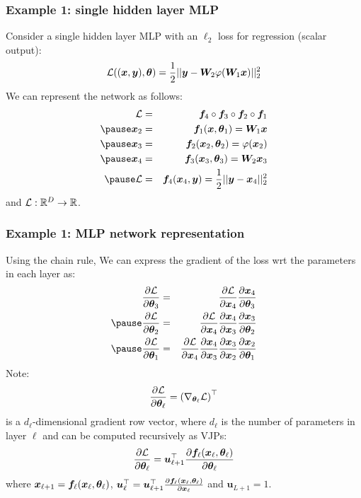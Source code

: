 \documentclass[smaller, handout]{beamer}
\begin{document}
\begin{frame}
  \frametitle{Example 1: single hidden layer MLP}\pause

  Consider a single hidden layer MLP with an $\ell_2$ loss for regression (scalar output):\pause
  \begin{equation}
    \mathcal{L}((\bm x, \bm y),\bm{\theta}) = \frac12 ||\bm y - \bm W_2\varphi(\bm W_1\bm x)||_2^2
  \end{equation}
  \pause
  We can represent the network as follows:\pause
  \begin{eqnarray}
    \mc L &=& \bm f_4 \circ \bm f_3 \circ \bm f_2 \circ \bm f_1  \\\pause
    \bm x_2 &=& \bm f_1(\bm x, \bm\th_1) = \bm W_1 \bm x \\\pause
    \bm x_3 &=& \bm f_2(\bm x_2, \bm\th_2) = \varphi(\bm x_2) \\\pause
    \bm x_4 &=& \bm f_3(\bm x_3, \bm\th_3) = \bm W_2 \bm x_3 \\\pause
    \mc L &=& \bm f_4(\bm x_4, \bm y) = \fr12||\bm y - \bm x_4||_2^2
  \end{eqnarray}
  and $\mathcal L : \mathbb{R}^D \to \mathbb{R}$.
\end{frame}
\begin{frame}
  \frametitle{Example 1: MLP network representation}\pause

  Using the chain rule, We can express the gradient of the loss wrt the parameters in each layer as:\pause
  \begin{eqnarray}
    \pd{\mc L}{\bm\th_3} &=& \pd{\mc L}{\bm x_4} \pd{\bm x_4}{\bm\th_3} \\\pause
    \pd{\mc L}{\bm\th_2} &=& \pd{\mc L}{\bm x_4} \pd{\bm x_4}{\bm x_3} \pd{\bm x_3}{\bm\th_2} \\ \pause
    \pd{\mc L}{\bm\th_1} &=& \pd{\mc L}{\bm x_4} \pd{\bm x_4}{\bm x_3} \pd{\bm x_3}{\bm x_2} \pd{\bm x_2}{\bm\th_1}
  \end{eqnarray}
  \pause
  Note:
  \begin{equation}
    \frac{\partial{\mathcal L}}{\partial{\bm{\theta}_\ell}} = \left(\nabla_{\bm{\theta}_\ell} \mathcal L\right)^{\top}
  \end{equation}
  is a $d_\ell$-dimensional gradient row vector, where $d_\ell$ is the number of parameters in layer $\ell$ \pause and can be computed recursively as VJPs:
  \begin{equation}
    \frac{\partial{\mathcal L}}{\partial{\bm{\theta}_\ell}} = \bm u_{\ell+1}^{\top} \frac{\partial{\bm f_\ell(\bm x_\ell, \bm{\theta}_\ell)}}{\partial{\bm{\theta}_\ell}}
  \end{equation}
  where $\bm x_{\ell+1} = \bm f_\ell(\bm x_\ell, \bm{\theta}_\ell)$, $\bm u_{\ell}^{\top} = \bm u_{\ell+1}^{\top}\frac{\partial{\bm f_\ell(\bm x_\ell, \bm{\theta}_\ell)}}{\partial{\bm x_{\ell}}}$ and $\bm u_{L+1} = 1$.
\end{frame}
\end{document}
